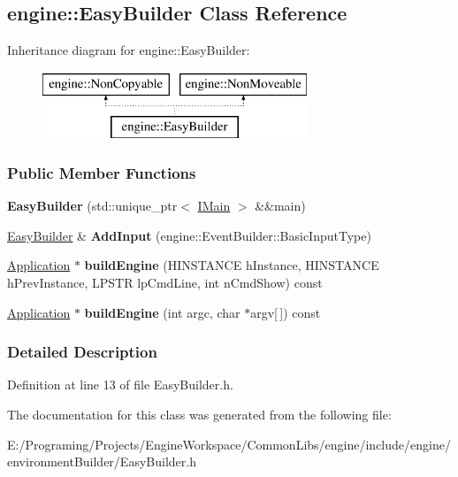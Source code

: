 \hypertarget{a00029}{}\subsection{engine\+:\+:Easy\+Builder Class Reference}
\label{a00029}
Inheritance diagram for engine\+:\+:Easy\+Builder\+:\begin{figure}[H]
\begin{center}
\leavevmode
\includegraphics[height=2.000000cm]{a00029}
\end{center}
\end{figure}
\subsubsection*{Public Member Functions}
\begin{DoxyCompactItemize}
\item 
{\bfseries Easy\+Builder} (std\+::unique\+\_\+ptr$<$ \hyperlink{a00045}{I\+Main} $>$ \&\&main)\hypertarget{a00029_a09b7e48d58c0867f7fa32fbc72f50b31}{}\label{a00029_a09b7e48d58c0867f7fa32fbc72f50b31}

\item 
\hyperlink{a00029}{Easy\+Builder} \& {\bfseries Add\+Input} (engine\+::\+Event\+Builder\+::\+Basic\+Input\+Type)\hypertarget{a00029_a8f38c9e1b46fa80982e4d779509ac93d}{}\label{a00029_a8f38c9e1b46fa80982e4d779509ac93d}

\item 
\hyperlink{a00002}{Application} $\ast$ {\bfseries build\+Engine} (H\+I\+N\+S\+T\+A\+N\+CE h\+Instance, H\+I\+N\+S\+T\+A\+N\+CE h\+Prev\+Instance, L\+P\+S\+TR lp\+Cmd\+Line, int n\+Cmd\+Show) const \hypertarget{a00029_adeeb5a7c09d1e05689ed6325282130d4}{}\label{a00029_adeeb5a7c09d1e05689ed6325282130d4}

\item 
\hyperlink{a00002}{Application} $\ast$ {\bfseries build\+Engine} (int argc, char $\ast$argv\mbox{[}$\,$\mbox{]}) const \hypertarget{a00029_a26beb6a3b5e9176bccd0c54149efb200}{}\label{a00029_a26beb6a3b5e9176bccd0c54149efb200}

\end{DoxyCompactItemize}


\subsubsection{Detailed Description}


Definition at line 13 of file Easy\+Builder.\+h.



The documentation for this class was generated from the following file\+:\begin{DoxyCompactItemize}
\item 
E\+:/\+Programing/\+Projects/\+Engine\+Workspace/\+Common\+Libs/engine/include/engine/environment\+Builder/Easy\+Builder.\+h\end{DoxyCompactItemize}
